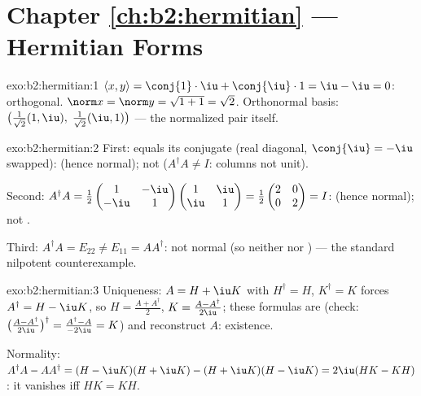 \section*{Chapter \ref{ch:b2:hermitian} --- Hermitian Forms}

\begin{solution}{exo:b2:hermitian:1}
$\langle x, y\rangle = \conj{1}\cdot\iu + \conj{\iu}\cdot 1 = \iu -
\iu = 0$: orthogonal. $\norm x = \norm y = \sqrt{1 + 1} = \sqrt2$.
Orthonormal basis: $\bigl(\frac{1}{\sqrt2}(1, \iu),\;
\frac{1}{\sqrt2}(\iu, 1)\bigr)$ --- the normalized pair itself.
\end{solution}

\begin{solution}{exo:b2:hermitian:2}
First: equals its conjugate  (real diagonal, $\conj{\iu} =
-\iu$ swapped):  (hence normal); not  ($A^\dagger A
\neq I$: columns not unit).

Second: $A^\dagger A = \frac12\begin{pmatrix} 1 & -\iu\\ -\iu &
1\end{pmatrix}\begin{pmatrix} 1 & \iu\\ \iu & 1\end{pmatrix} =
\frac12\begin{pmatrix} 2 & 0\\ 0 & 2\end{pmatrix} = I$: 
(hence normal); not .

Third: $A^\dagger A = E_{22} \neq E_{11} = AA^\dagger$: not normal
(so neither  nor ) --- the standard nilpotent
counterexample.
\end{solution}

\begin{solution}{exo:b2:hermitian:3}
Uniqueness: $A = H + \iu K$ with $H^\dagger = H$, $K^\dagger = K$
forces $A^\dagger = H - \iu K$, so $H = \frac{A + A^\dagger}{2}$,
$K = \frac{A - A^\dagger}{2\iu}$; these formulas are 
(check: $\bigl(\frac{A - A^\dagger}{2\iu}\bigr)^\dagger = \frac{
A^\dagger - A}{-2\iu} = K$) and reconstruct $A$: existence.

Normality: $A^\dagger A - AA^\dagger = (H - \iu K)(H + \iu K) - (H
+ \iu K)(H - \iu K) = 2\iu(HK - KH)$: it vanishes iff $HK = KH$.
\end{solution}

